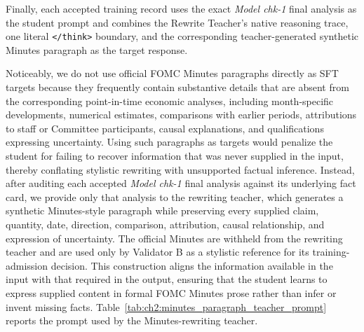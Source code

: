 Finally, each accepted training record uses the exact \textit{Model chk-1} final analysis as the student prompt and combines the Rewrite Teacher’s native reasoning trace, one literal \texttt{</think>} boundary, and the corresponding teacher-generated synthetic Minutes paragraph as the target response.


Noticeably, we do not use official FOMC Minutes paragraphs directly as SFT targets because they frequently contain substantive details that are absent from the corresponding point-in-time economic analyses, including month-specific developments, numerical estimates, comparisons with earlier periods, attributions to staff or Committee participants, causal explanations, and qualifications expressing uncertainty. Using such paragraphs as targets would penalize the student for failing to recover information that was never supplied in the input, thereby conflating stylistic rewriting with unsupported factual inference. Instead, after auditing each accepted \textit{Model chk-1} final analysis against its underlying fact card, we provide only that analysis to the rewriting teacher, which generates a synthetic Minutes-style paragraph while preserving every supplied claim, quantity, date, direction, comparison, attribution, causal relationship, and expression of uncertainty. The official Minutes are withheld from the rewriting teacher and are used only by Validator B as a stylistic reference for its training-admission decision. This construction aligns the information available in the input with that required in the output, ensuring that the student learns to express supplied content in formal FOMC Minutes prose rather than infer or invent missing facts. Table~\ref{tab:ch2:minutes_paragraph_teacher_prompt} reports the prompt used by the Minutes-rewriting teacher.

